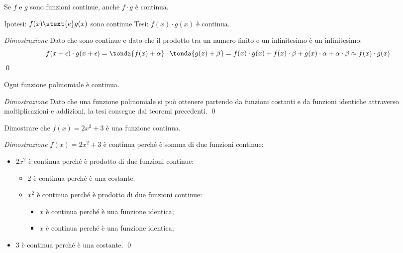 \begin{teorema}
Se \(f\) e \(g\) sono funzioni continue, anche \(f \cdot g\) è continua.
\end{teorema}

\noindent Ipotesi: 
\(f(x) \stext{e} g(x)\) sono continue
\tab Tesi: 
\(f(x) \cdot g(x)\) è continua.

\emph{Dimostrazione}
Dato che sono continue e dato che il prodotto tra un numero finito e un 
infinitesimo è un infinitesimo: 
\[f(x+\epsilon) \cdot g(x+\epsilon) = 
\tonda{f(x)+\alpha} \cdot \tonda{g(x)+\beta} = 
f(x) \cdot g(x) + f(x) \cdot \beta + g(x) \cdot \alpha + \alpha \cdot \beta
\approx f(x) \cdot g(x)\]
\qed

\begin{corollario}
 Ogni funzione polinomiale è continua.
\end{corollario}

\emph{Dimostrazione}
Dato che una funzione polinomiale si può ottenere partendo da funzioni 
costanti e da funzioni identiche attraverso moltiplicazioni e addizioni, 
la tesi consegue dai teoremi precedenti. \qed

\begin{esempio}
 Dimostrare che \(f(x)=2x^2 + 3\) è una funzione continua.

\emph{Dimostrazione}
\(f(x)=2x^2 + 3\) è continua perché è somma di due funzioni continue: 
 \begin{itemize}[noitemsep]
  \item \(2x^2\) è continua perché è prodotto di due funzioni continue:
  \begin{itemize}[nosep]
   \item \(2\) è continua perché è una costante;
   \item \(x^2\) è continua perché è prodotto di due funzioni continue:
   \begin{itemize}[nosep]
    \item \(x\) è continua perché è una funzione identica;
    \item \(x\) è continua perché è una funzione identica;
   \end{itemize}
  \end{itemize}
  \item \(3\) è continua perché è una costante. \qed
 \end{itemize}
\end{esempio}

